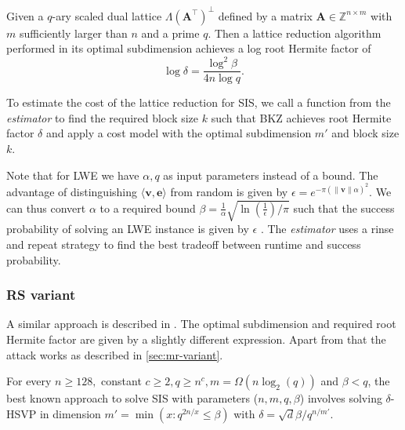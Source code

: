 \begin{theorem}
  Given a $q$-ary scaled dual lattice $\Lambda(\mathbf{A}^\intercal)^{\perp}$ defined by a matrix $\mathbf{A} \in \mathbb{Z}^{n \times m}$ with $m$ sufficiently larger than $n$ and a prime $q$. Then a lattice reduction algorithm performed in its optimal subdimension achieves a log root Hermite factor of
  \begin{equation}
    \log \delta = \frac{\log^2 \beta}{4n \log q}. \label{eq:mr-log-RHF}
  \end{equation}
\end{theorem}

To estimate the cost of the lattice reduction for SIS, we call a function from the \textit{estimator} to find the required block size $k$ such that BKZ achieves root Hermite factor $\delta$ and apply a cost model with the optimal subdimension $m'$ and block size $k$.

Note that for LWE we have $\alpha, q$ as input parameters instead of a bound. The advantage of distinguishing $\langle \mathbf{v}, \mathbf{e}\rangle$ from random is given by  $\epsilon = e^{-\pi (\| \mathbf{v}\| \alpha)^2}$. We can thus convert $\alpha$ to a required bound $\beta = \frac{1}{\alpha} \sqrt{\ln (\frac{1}{\epsilon})/ \pi}$ such that the success probability of solving an LWE instance is given by $\epsilon$ \cite[Corollary~2]{APS15}. The \textit{estimator} uses a rinse and repeat strategy to find the best tradeoff between runtime and success probability.






\subsubsection{RS variant \cite{RS10}}

A similar approach is described in \cite{RS10}. The optimal subdimension and required root Hermite factor are given by a slightly different expression. Apart from that the attack works as described in \cref{sec:mr-variant}.

\begin{theorem}
  For every $n \geq 128,$ constant $c \geq 2, q \geq n^c, m = \Omega(n \log_2(q))$ and $\beta < q$, the best known approach to solve SIS with parameters ($n, m, q, \beta$) involves solving $\delta$-HSVP in dimension $m' = \min(x : q^{2n/x} \leq \beta)$ with $\delta = \sqrt{d}{\beta / q^{n/m'}}$.
\end{theorem}

